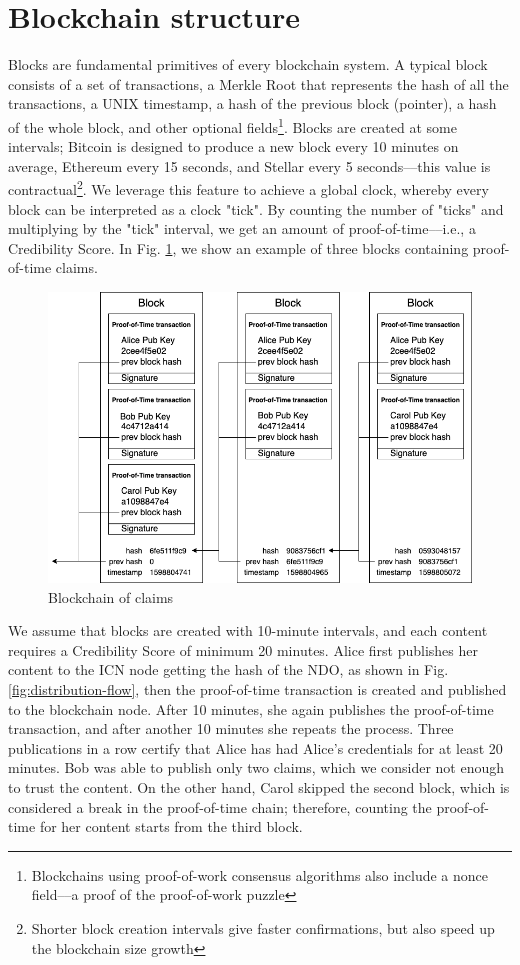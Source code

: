 \section{Blockchain structure}
\label{blockchain-structure}
Blocks are fundamental primitives of every blockchain system. A typical block consists of a set of transactions, a Merkle Root \cite{merkle1989certified} that represents the hash of all the transactions, a UNIX timestamp, a hash of the previous block (pointer), a hash of the whole block, and other optional fields\footnote{Blockchains using proof-of-work consensus algorithms also include a nonce field––a proof of the proof-of-work puzzle}.
Blocks are created at some intervals; Bitcoin is designed to produce a new block every 10 minutes on average, Ethereum every 15 seconds, and Stellar every 5 seconds––this value is contractual\footnote{Shorter block creation intervals give faster confirmations, but also speed up the blockchain size growth}. We leverage this feature to achieve a global clock, whereby every block can be interpreted as a clock "tick". By counting the number of "ticks" and multiplying by the "tick" interval, we get an amount of proof-of-time––i.e., a Credibility Score. In Fig. \ref{fig:blockchain-of-claims}, we show an example of three blocks containing proof-of-time claims.
\begin{figure}[h!]
\includegraphics[width=\textwidth]{img/blockchain_of_claims.png}
\centering
\caption{Blockchain of claims}
\label{fig:blockchain-of-claims}
\end{figure} 
We assume that blocks are created with 10-minute intervals, and each content requires a Credibility Score of minimum 20 minutes. Alice first publishes her content to the ICN node getting the hash of the NDO, as shown in Fig. \ref{fig:distribution-flow}, then the proof-of-time transaction is created and published to the blockchain node. After 10 minutes, she again publishes the proof-of-time transaction, and after another 10 minutes she repeats the process. Three publications in a row certify that Alice has had Alice's credentials for at least 20 minutes. Bob was able to publish only two claims, which we consider not enough to trust the content. On the other hand, Carol skipped the second block, which is considered a break in the proof-of-time chain; therefore, counting the proof-of-time for her content starts from the third block. 

